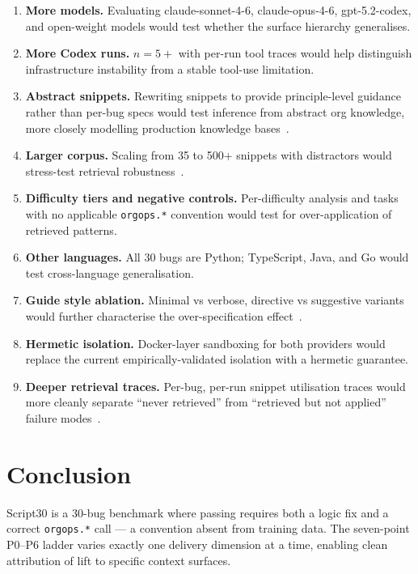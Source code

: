\documentclass[10pt,a4paper,twocolumn]{article}
\begin{document}
\begin{enumerate}
    \item \textbf{More models.} Evaluating claude-sonnet-4-6,
    claude-opus-4-6, gpt-5.2-codex, and open-weight models would test
    whether the surface hierarchy generalises.
    \item \textbf{More Codex runs.} $n{=}5+$ with per-run tool traces
    would help distinguish infrastructure instability from a stable
    tool-use limitation.
    \item \textbf{Abstract snippets.} Rewriting snippets to provide
    principle-level guidance rather than per-bug specs would test
    inference from abstract org knowledge, more closely modelling
    production knowledge bases~\citep{gu2025whattoretrieve}.
    \item \textbf{Larger corpus.} Scaling from 35 to 500+ snippets with
    distractors would stress-test retrieval
    robustness~\citep{wang2024coderagbench}.
    \item \textbf{Difficulty tiers and negative controls.} Per-difficulty
    analysis and tasks with no applicable \texttt{orgops.*} convention
    would test for over-application of retrieved patterns.
    \item \textbf{Other languages.} All 30 bugs are Python; TypeScript,
    Java, and Go would test cross-language generalisation.
    \item \textbf{Guide style ablation.} Minimal vs verbose, directive vs
    suggestive variants would further characterise the over-specification
    effect~\citep{li2026skillsbench,gloaguen2026agentsmd}.
    \item \textbf{Hermetic isolation.} Docker-layer sandboxing for both
    providers would replace the current empirically-validated isolation
    with a hermetic guarantee.
    \item \textbf{Deeper retrieval traces.} Per-bug, per-run snippet
    utilisation traces would more cleanly separate ``never retrieved''
    from ``retrieved but not applied'' failure
    modes~\citep{cai2026contextbench}.
\end{enumerate}

\section{Conclusion}
\label{sec:conclusion}

Script30 is a 30-bug benchmark where passing requires both a logic fix
and a correct \texttt{orgops.*} call --- a convention absent from
training data.
The seven-point P0--P6 ladder varies exactly one delivery dimension at a
time, enabling clean attribution of lift to specific context surfaces.
\end{document}
